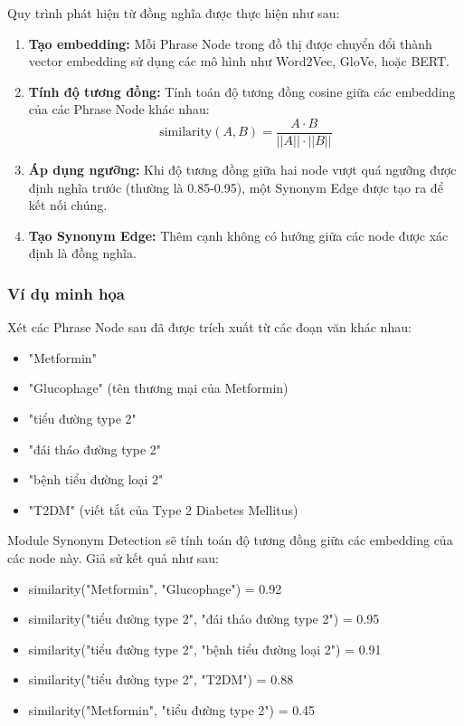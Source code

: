Quy trình phát hiện từ đồng nghĩa được thực hiện như sau:
\begin{enumerate}
    \item \textbf{Tạo embedding:} Mỗi Phrase Node trong đồ thị được chuyển đổi thành vector embedding sử dụng các mô hình như Word2Vec, GloVe, hoặc BERT.
    
    \item \textbf{Tính độ tương đồng:} Tính toán độ tương đồng cosine giữa các embedding của các Phrase Node khác nhau:
    \begin{equation}
    \text{similarity}(A, B) = \frac{A \cdot B}{||A|| \cdot ||B||}
    \end{equation}
    
    \item \textbf{Áp dụng ngưỡng:} Khi độ tương đồng giữa hai node vượt quá ngưỡng được định nghĩa trước (thường là 0.85-0.95), một Synonym Edge được tạo ra để kết nối chúng.
    
    \item \textbf{Tạo Synonym Edge:} Thêm cạnh không có hướng giữa các node được xác định là đồng nghĩa.
\end{enumerate}

\subsubsection{Ví dụ minh họa}
Xét các Phrase Node sau đã được trích xuất từ các đoạn văn khác nhau:

\begin{itemize}
    \item "Metformin"
    \item "Glucophage" (tên thương mại của Metformin)
    \item "tiểu đường type 2"
    \item "đái tháo đường type 2"
    \item "bệnh tiểu đường loại 2"
    \item "T2DM" (viết tắt của Type 2 Diabetes Mellitus)
\end{itemize}

Module Synonym Detection sẽ tính toán độ tương đồng giữa các embedding của các node này. Giả sử kết quả như sau:

\begin{itemize}
    \item similarity("Metformin", "Glucophage") = 0.92
    \item similarity("tiểu đường type 2", "đái tháo đường type 2") = 0.95
    \item similarity("tiểu đường type 2", "bệnh tiểu đường loại 2") = 0.91
    \item similarity("tiểu đường type 2", "T2DM") = 0.88
    \item similarity("Metformin", "tiểu đường type 2") = 0.45
\end{itemize}

